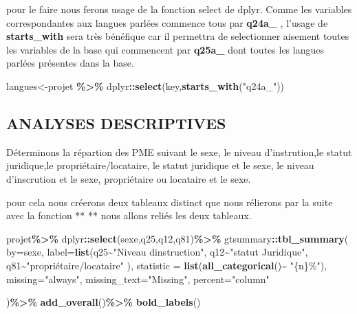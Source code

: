 \documentclass[
]{article}
\newenvironment{Shaded}{\begin{snugshade}}{\end{snugshade}}
\newcommand{\AttributeTok}[1]{\textcolor[rgb]{0.13,0.29,0.53}{#1}}
\newcommand{\FunctionTok}[1]{\textcolor[rgb]{0.13,0.29,0.53}{\textbf{#1}}}
\newcommand{\NormalTok}[1]{#1}
\newcommand{\OtherTok}[1]{\textcolor[rgb]{0.56,0.35,0.01}{#1}}
\newcommand{\SpecialCharTok}[1]{\textcolor[rgb]{0.81,0.36,0.00}{\textbf{#1}}}
\newcommand{\StringTok}[1]{\textcolor[rgb]{0.31,0.60,0.02}{#1}}
\begin{document}
pour le faire nous ferons usage de la fonction select de dplyr. Comme
les variables correspondantes aux langues parlées commence tous par
\textbf{q24a\_} , l'usage de \textbf{starts\_with} sera très bénéfique
car il permettra de selectionner aisement toutes les variables de la
base qui commencent par \textbf{q25a\_} dont toutes les langues parlées
présentes dans la base.

\begin{Shaded}
\begin{Highlighting}[]
\NormalTok{langues}\OtherTok{\textless{}{-}}\NormalTok{projet }\SpecialCharTok{\%\textgreater{}\%}\NormalTok{ dplyr}\SpecialCharTok{::}\FunctionTok{select}\NormalTok{(key,}\FunctionTok{starts\_with}\NormalTok{(}\StringTok{"q24a\_"}\NormalTok{))}
\end{Highlighting}
\end{Shaded}

\hypertarget{analyses-descriptives}{%
\subsection{ANALYSES DESCRIPTIVES}\label{analyses-descriptives}}

Déterminons la répartion des PME suivant le sexe, le niveau
d'instrution,le statut juridique,le propriétaire/locataire, le statut
juridique et le sexe, le niveau d'inscrution et le sexe, propriétaire ou
locataire et le sexe.

pour cela nous créerons deux tableaux distinct que nous rélierons par la
suite avec la fonction ** ** nous allons reliés les deux tableaux.

\begin{Shaded}
\begin{Highlighting}[]
\NormalTok{projet}\SpecialCharTok{\%\textgreater{}\%} 
\NormalTok{  dplyr}\SpecialCharTok{::}\FunctionTok{select}\NormalTok{(sexe,q25,q12,q81)}\SpecialCharTok{\%\textgreater{}\%}
\NormalTok{  gtsummary}\SpecialCharTok{::}\FunctionTok{tbl\_summary}\NormalTok{(}
    \AttributeTok{by=}\NormalTok{sexe,}
    \AttributeTok{label=}\FunctionTok{list}\NormalTok{(q25}\SpecialCharTok{\textasciitilde{}}\StringTok{"Niveau d\textquotesingle{}instruction"}\NormalTok{, }
\NormalTok{               q12}\SpecialCharTok{\textasciitilde{}}\StringTok{"statut Juridique"}\NormalTok{,}
\NormalTok{               q81}\SpecialCharTok{\textasciitilde{}}\StringTok{"propriétaire/locataire"}
\NormalTok{    ),}
   \AttributeTok{statistic =} \FunctionTok{list}\NormalTok{(}\FunctionTok{all\_categorical}\NormalTok{()}\SpecialCharTok{\textasciitilde{}} \StringTok{"\{n\}\%"}\NormalTok{),}
   \AttributeTok{missing=}\StringTok{"always"}\NormalTok{,}
   \AttributeTok{missing\_text=}\StringTok{"Missing"}\NormalTok{,}
   \AttributeTok{percent=}\StringTok{"column"}
   
\NormalTok{  )}\SpecialCharTok{\%\textgreater{}\%}
\FunctionTok{add\_overall}\NormalTok{()}\SpecialCharTok{\%\textgreater{}\%}
\FunctionTok{bold\_labels}\NormalTok{()}
\end{Highlighting}
\end{Shaded}
\end{document}

